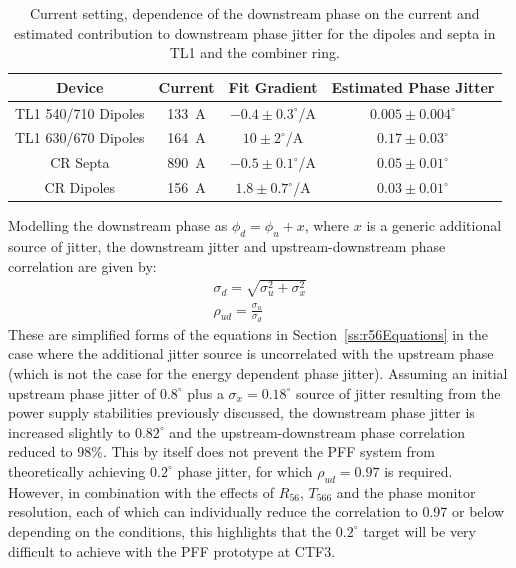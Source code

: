 \begin{table}
  \begin{center}
    \begin{tabular}{| c c c c |}
	   \hline
       Device & Current & Fit Gradient & Estimated Phase Jitter \\ \hline
       TL1 540/710 Dipoles & 133~A & \(-0.4\pm0.3^\circ\)/A & \(0.005\pm0.004^\circ\)\\
       TL1 630/670 Dipoles & 164~A & \(10\pm2^\circ\)/A & \(0.17\pm0.03^\circ\)\\
       CR Septa & 890~A &  \(-0.5\pm0.1^\circ\)/A & \(0.05\pm0.01^\circ\)\\
       CR Dipoles & 156~A & \(1.8\pm0.7^\circ\)/A & \(0.03\pm0.01^\circ\)\\ \hline 
    \end{tabular}
    \caption{Current setting, dependence of the downstream phase on the current and estimated contribution to downstream phase jitter for the dipoles and septa in TL1 and the combiner ring.}
  	\label{t:otherJitSources}
  \end{center}
\end{table}

Modelling the downstream phase as \(\phi_d = \phi_u + x\), where \(x\) is a generic additional source of jitter, the downstream jitter and upstream-downstream phase correlation are given by:
\begin{eqnarray}
\sigma_d = \sqrt{\sigma_u^2 + \sigma_x^2} \\
\rho_{ud} = \frac{\sigma_u}{\sigma_d}
\end{eqnarray}
These are simplified forms of the equations in Section~\ref{ss:r56Equations} in the case where the additional jitter source is uncorrelated with the upstream phase (which is not the case for the energy dependent phase jitter). Assuming an initial upstream phase jitter of \(0.8^\circ\) plus a \(\sigma_x = 0.18^\circ\) source of jitter resulting from the power supply stabilities previously discussed, the downstream phase jitter is increased slightly to \(0.82^\circ\) and the upstream-downstream phase correlation reduced to \(98\%\). This by itself does not prevent the PFF system from theoretically achieving \(0.2^\circ\) phase jitter, for which \(\rho_{ud} = 0.97\) is required. However, in combination with the effects of \(R_{56}\), \(T_{566}\) and the phase monitor resolution, each of which can individually reduce the correlation to 0.97 or below depending on the conditions, this highlights that the \(0.2^\circ\) target will be very difficult to achieve with the PFF prototype at CTF3.
